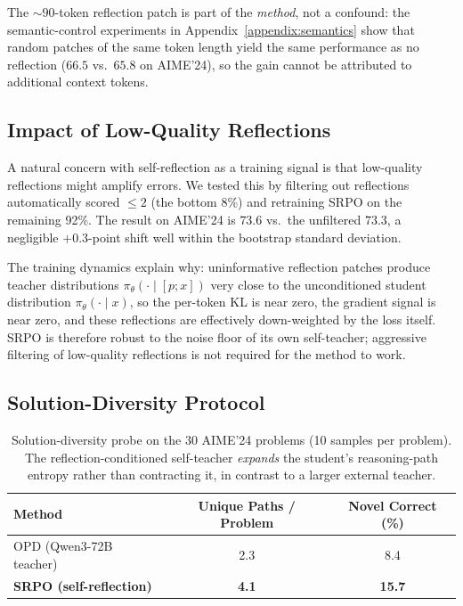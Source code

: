 \documentclass{article}
\newcommand{\method}{SRPO}
\theoremstyle{plain}
\theoremstyle{definition}
\theoremstyle{remark}
\begin{document}
The $\sim$$90$-token reflection patch is part of the \emph{method}, not a confound: the semantic-control experiments in Appendix~\ref{appendix:semantics} show that random patches of the same token length yield the same performance as no reflection ($66.5$ vs.\ $65.8$ on AIME'24), so the gain cannot be attributed to additional context tokens.

\subsection{Impact of Low-Quality Reflections}
\label{appendix:lowqual}

A natural concern with self-reflection as a training signal is that low-quality reflections might amplify errors.
We tested this by filtering out reflections automatically scored $\leq 2$ (the bottom 8\%) and retraining \method{} on the remaining 92\%.
The result on AIME'24 is $73.6$ vs.\ the unfiltered $73.3$, a negligible $+0.3$-point shift well within the bootstrap standard deviation.

The training dynamics explain why: uninformative reflection patches produce teacher distributions $\pi_\theta(\cdot \mid [p;x])$ very close to the unconditioned student distribution $\pi_\theta(\cdot \mid x)$, so the per-token KL is near zero, the gradient signal is near zero, and these reflections are effectively down-weighted by the loss itself.
\method{} is therefore robust to the noise floor of its own self-teacher; aggressive filtering of low-quality reflections is not required for the method to work.

\subsection{Solution-Diversity Protocol}
\label{appendix:diversity}

\begin{table}[h]
\centering
\caption{Solution-diversity probe on the 30 AIME'24 problems (10 samples per problem). The reflection-conditioned self-teacher \emph{expands} the student's reasoning-path entropy rather than contracting it, in contrast to a larger external teacher.}
\label{tab:diversity}
\vspace{0.4em}
\small
\begin{tabular}{@{}lcc@{}}
\toprule
\textbf{Method} & \textbf{Unique Paths / Problem} & \textbf{Novel Correct (\%)} \\
\midrule
OPD (Qwen3-72B teacher) & 2.3 & 8.4 \\
\rowcolor{gray!15}
\textbf{\method{} (self-reflection)} & \textbf{4.1} & \textbf{15.7} \\
\bottomrule
\end{tabular}
\end{table}
\end{document}
